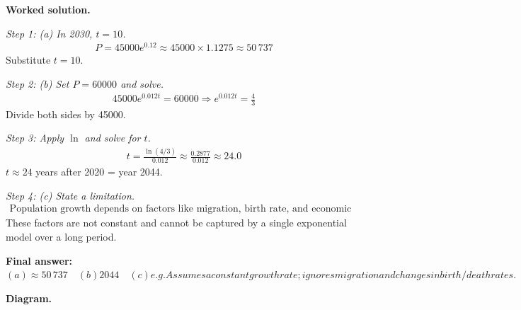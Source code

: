 \documentclass[11pt]{article}
\begin{document}
\textbf{Worked solution.}

\textit{Step 1: (a) In 2030, \( t = 10 \).}
\[\begin{gathered}
P = 45000e^{0.12} \approx 45000 \times 1.1275 \approx 50\,737
\end{gathered}\]
Substitute \( t = 10 \).

\textit{Step 2: (b) Set \( P = 60000 \) and solve.}
\[\begin{gathered}
45000e^{0.012t} = 60000 \Rightarrow e^{0.012t} = \frac{4}{3}
\end{gathered}\]
Divide both sides by 45000.

\textit{Step 3: Apply \( \ln \) and solve for \( t \).}
\[\begin{gathered}
t = \frac{\ln(4/3)}{0.012} \approx \frac{0.2877}{0.012} \approx 24.0
\end{gathered}\]
\( t \approx 24 \) years after 2020 = year 2044.

\textit{Step 4: (c) State a limitation.}
\[\begin{gathered}
\text{Population growth depends on factors like migration, birth rate, and economic conditions.}
\end{gathered}\]
These factors are not constant and cannot be captured by a single exponential model over a long period.

\begin{answerbox}
\textbf{Final answer:}\quad \(\displaystyle (a) \approx 50\,737 \quad  (b) 2044 \quad  (c) e.g. Assumes a constant growth rate; ignores migration and changes in birth/death rates.\)
\end{answerbox}
\textbf{Diagram.}
\end{document}

